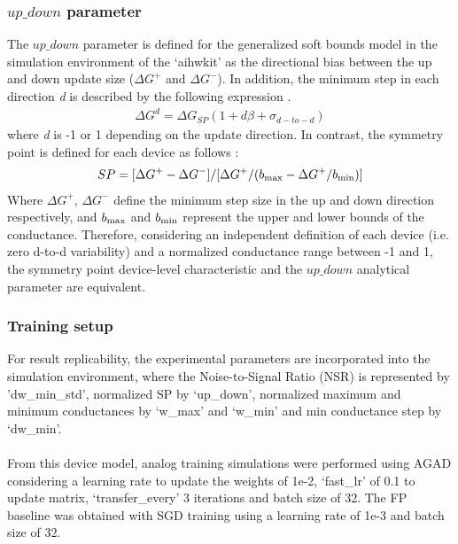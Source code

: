 \subsubsection*{$up\_down$ parameter}
The $up\_down$ parameter is defined for the generalized soft bounds model in the simulation environment of the ‘aihwkit’ as the directional bias between the up and down update size ($\Delta G^+$ and $\Delta G^-$). In addition, the minimum step in each direction \textit{d} is described by the following expression \cite{Rasch2021AFlexible}.
\begin{align}
    \Delta G^d = \Delta G_{SP} (1 + d\beta + \sigma_{d-to-d})
   \label{eqS1}
\end{align}
where \textit{d} is -1 or 1 depending on the update direction. In contrast, the symmetry point is defined for each device as follows \cite{Rasch2024Agad}:
\begin{align}
    SP = [\Delta G^+ - \Delta G^-]/[\Delta G^+ / (b_{\rm max} - \Delta G^+/b_{\rm min})]
   \label{eqS2}
\end{align}
Where $\Delta G^+$, $\Delta G^-$ define the minimum step size in the up and down direction respectively, and $b_{\rm max}$ and $b_{\rm min}$ represent the upper and lower bounds of the conductance. Therefore, considering an independent definition of each device (i.e. zero d-to-d variability) and a normalized conductance range between -1 and 1, the symmetry point device-level characteristic and the $up\_down$ analytical parameter are equivalent.

\subsubsection*{Training setup}
For result replicability, the experimental parameters are incorporated into the simulation environment, where the Noise-to-Signal Ratio (NSR) is represented by  'dw\_min\_std', normalized SP by ‘up\_down’, normalized maximum and minimum conductances by ‘w\_max’ and ‘w\_min’ and min conductance step by ‘dw\_min’. 
\\
\\
From this device model, analog training simulations were performed using AGAD considering a learning rate to update the weights of 1e-2, ‘fast\_lr’ of 0.1 to update matrix, ‘transfer\_every’ 3 iterations and batch size of 32. The FP baseline was obtained with SGD training using a learning rate of 1e-3 and batch size of 32. 
